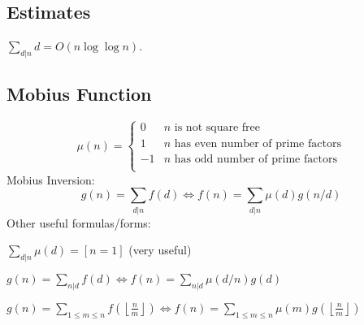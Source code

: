 \subsection{Estimates}
	$\sum_{d|n} d = O(n \log \log n)$.


\subsection{Mobius Function}
\[
	\mu(n) = \begin{cases} 0 & n \textrm{ is not square free}\\ 1 & n \textrm{ has even number of prime factors}\\ -1 & n \textrm{ has odd number of prime factors}\\\end{cases}
\]
  Mobius Inversion:
  \[ g(n) = \sum_{d|n} f(d) \Leftrightarrow f(n) = \sum_{d|n} \mu(d)g(n/d) \]
  Other useful formulas/forms:

  $ \sum_{d | n} \mu(d) = [ n = 1] $ (very useful)

  $ g(n) = \sum_{n|d} f(d) \Leftrightarrow f(n) = \sum_{n|d} \mu(d/n)g(d)$

 $ g(n) = \sum_{1 \leq m \leq n} f(\left\lfloor\frac{n}{m}\right \rfloor ) \Leftrightarrow f(n) = \sum_{1\leq m\leq n} \mu(m)g(\left\lfloor\frac{n}{m}\right\rfloor)$
